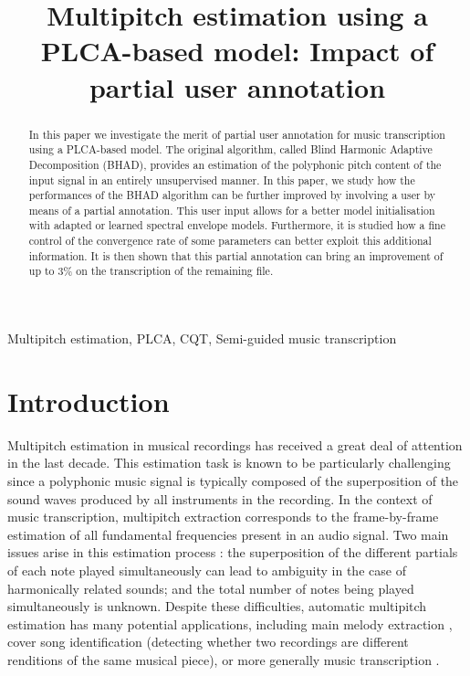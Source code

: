 \documentclass{article}
\title{Multipitch estimation using a PLCA-based model: Impact of partial user annotation} %
\begin{document}
\ninept
%
\maketitle
%
\begin{abstract}
In this paper we investigate the merit of partial user annotation for music transcription using a PLCA-based model. The original algorithm, called Blind Harmonic Adaptive Decomposition (BHAD), provides an estimation of the polyphonic pitch content of the input signal in an entirely unsupervised manner. In this paper, we study how the performances of the BHAD algorithm can be further improved by involving a user by means of a partial annotation. This user input allows for a better model initialisation with adapted or learned spectral envelope models. Furthermore, it is studied how a fine control of the convergence rate of some parameters can better exploit this additional information. It is then shown that this partial annotation can bring an improvement of up to 3\% on the transcription of the remaining file.
\end{abstract}
%
\begin{keywords}
Multipitch estimation, PLCA, CQT, Semi-guided music transcription
\end{keywords}
%

\vspace{0.4cm}

\section{Introduction}
\label{sec:intro}

Multipitch estimation in musical recordings has received a great deal of attention in the last decade. This estimation task is known to be particularly challenging since a polyphonic music signal is typically composed of the
superposition of the sound waves produced by all instruments in the recording. In the context of music transcription,
multipitch extraction corresponds to the frame-by-frame estimation of all fundamental frequencies present in an audio signal.
Two main issues arise in this estimation process :
the superposition of the different partials of each note played simultaneously can lead to ambiguity in the case of harmonically related sounds; and the total number of notes being played simultaneously is unknown.
Despite these difficulties, automatic multipitch estimation has many potential applications, including main melody extraction \cite{JS:SigMag2014, Durrieu2011, toosMelodyICASSP10}, cover song identification \cite{salamonVersionIDQBH-MMIR13} (detecting whether two recordings are different renditions of the same musical piece), or more generally music transcription \cite{HainsworthPhD}.
\end{document}

